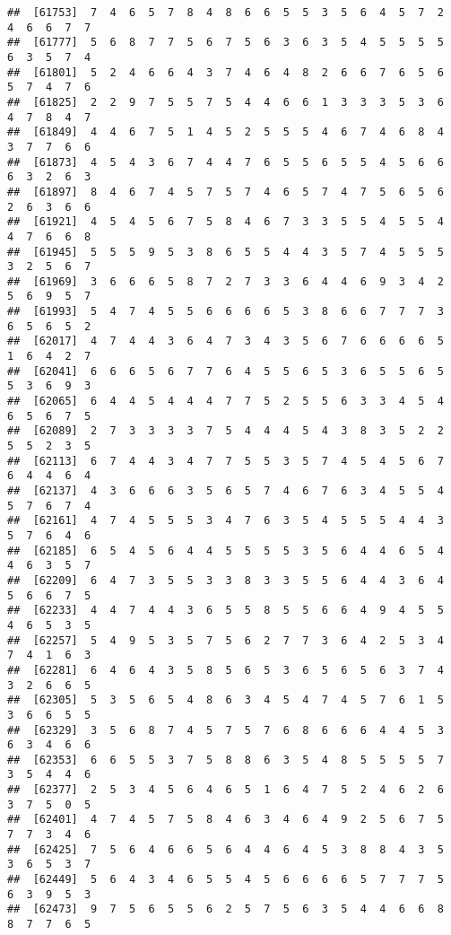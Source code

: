 \documentclass[
]{book}
\begin{document}
\begin{verbatim}
##  [61753]  7  4  6  5  7  8  4  8  6  6  5  5  3  5  6  4  5  7  2  4  6  6  7  7
##  [61777]  5  6  8  7  7  5  6  7  5  6  3  6  3  5  4  5  5  5  5  6  3  5  7  4
##  [61801]  5  2  4  6  6  4  3  7  4  6  4  8  2  6  6  7  6  5  6  5  7  4  7  6
##  [61825]  2  2  9  7  5  5  7  5  4  4  6  6  1  3  3  3  5  3  6  4  7  8  4  7
##  [61849]  4  4  6  7  5  1  4  5  2  5  5  5  4  6  7  4  6  8  4  3  7  7  6  6
##  [61873]  4  5  4  3  6  7  4  4  7  6  5  5  6  5  5  4  5  6  6  6  3  2  6  3
##  [61897]  8  4  6  7  4  5  7  5  7  4  6  5  7  4  7  5  6  5  6  2  6  3  6  6
##  [61921]  4  5  4  5  6  7  5  8  4  6  7  3  3  5  5  4  5  5  4  4  7  6  6  8
##  [61945]  5  5  5  9  5  3  8  6  5  5  4  4  3  5  7  4  5  5  5  3  2  5  6  7
##  [61969]  3  6  6  6  5  8  7  2  7  3  3  6  4  4  6  9  3  4  2  5  6  9  5  7
##  [61993]  5  4  7  4  5  5  6  6  6  6  5  3  8  6  6  7  7  7  3  6  5  6  5  2
##  [62017]  4  7  4  4  3  6  4  7  3  4  3  5  6  7  6  6  6  6  5  1  6  4  2  7
##  [62041]  6  6  6  5  6  7  7  6  4  5  5  6  5  3  6  5  5  6  5  5  3  6  9  3
##  [62065]  6  4  4  5  4  4  4  7  7  5  2  5  5  6  3  3  4  5  4  6  5  6  7  5
##  [62089]  2  7  3  3  3  3  7  5  4  4  4  5  4  3  8  3  5  2  2  5  5  2  3  5
##  [62113]  6  7  4  4  3  4  7  7  5  5  3  5  7  4  5  4  5  6  7  6  4  4  6  4
##  [62137]  4  3  6  6  6  3  5  6  5  7  4  6  7  6  3  4  5  5  4  5  7  6  7  4
##  [62161]  4  7  4  5  5  5  3  4  7  6  3  5  4  5  5  5  4  4  3  5  7  6  4  6
##  [62185]  6  5  4  5  6  4  4  5  5  5  5  3  5  6  4  4  6  5  4  4  6  3  5  7
##  [62209]  6  4  7  3  5  5  3  3  8  3  3  5  5  6  4  4  3  6  4  5  6  6  7  5
##  [62233]  4  4  7  4  4  3  6  5  5  8  5  5  6  6  4  9  4  5  5  4  6  5  3  5
##  [62257]  5  4  9  5  3  5  7  5  6  2  7  7  3  6  4  2  5  3  4  7  4  1  6  3
##  [62281]  6  4  6  4  3  5  8  5  6  5  3  6  5  6  5  6  3  7  4  3  2  6  6  5
##  [62305]  5  3  5  6  5  4  8  6  3  4  5  4  7  4  5  7  6  1  5  3  6  6  5  5
##  [62329]  3  5  6  8  7  4  5  7  5  7  6  8  6  6  6  4  4  5  3  6  3  4  6  6
##  [62353]  6  6  5  5  3  7  5  8  8  6  3  5  4  8  5  5  5  5  7  3  5  4  4  6
##  [62377]  2  5  3  4  5  6  4  6  5  1  6  4  7  5  2  4  6  2  6  3  7  5  0  5
##  [62401]  4  7  4  5  7  5  8  4  6  3  4  6  4  9  2  5  6  7  5  7  7  3  4  6
##  [62425]  7  5  6  4  6  6  5  6  4  4  6  4  5  3  8  8  4  3  5  3  6  5  3  7
##  [62449]  5  6  4  3  4  6  5  5  4  5  6  6  6  6  5  7  7  7  5  6  3  9  5  3
##  [62473]  9  7  5  6  5  5  6  2  5  7  5  6  3  5  4  4  6  6  8  8  7  7  6  5

\end{verbatim}
\end{document}
